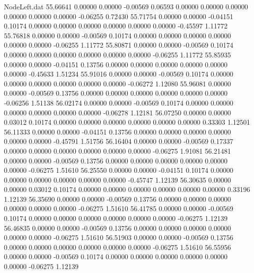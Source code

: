 \begin{filecontents}{NodeLeft.dat}
  55.66641    0.00000    0.00000    -0.00569    0.06593    0.00000    0.00000    0.00000    0.00000    0.00000    0.00000   -0.06255    0.72430
  55.71754    0.00000    0.00000    -0.04151    0.10174    0.00000    0.00000    0.00000    0.00000    0.00000    0.00000   -0.45597    1.11772
  55.76818    0.00000    0.00000    -0.00569    0.10174    0.00000    0.00000    0.00000    0.00000    0.00000    0.00000   -0.06255    1.11772
  55.80871    0.00000    0.00000    -0.00569    0.10174    0.00000    0.00000    0.00000    0.00000    0.00000    0.00000   -0.06255    1.11772
  55.85935    0.00000    0.00000    -0.04151    0.13756    0.00000    0.00000    0.00000    0.00000    0.00000    0.00000   -0.45633    1.51234
  55.91016    0.00000    0.00000    -0.00569    0.10174    0.00000    0.00000    0.00000    0.00000    0.00000    0.00000   -0.06272    1.12080
  55.96081    0.00000    0.00000    -0.00569    0.13756    0.00000    0.00000    0.00000    0.00000    0.00000    0.00000   -0.06256    1.51138
  56.02174    0.00000    0.00000    -0.00569    0.10174    0.00000    0.00000    0.00000    0.00000    0.00000    0.00000   -0.06278    1.12181
  56.07250    0.00000    0.00000     0.03012    0.10174    0.00000    0.00000    0.00000    0.00000    0.00000    0.00000    0.33303    1.12501
  56.11333    0.00000    0.00000    -0.04151    0.13756    0.00000    0.00000    0.00000    0.00000    0.00000    0.00000   -0.45791    1.51756
  56.16404    0.00000    0.00000    -0.00569    0.17337    0.00000    0.00000    0.00000    0.00000    0.00000    0.00000   -0.06275    1.91081
  56.21481    0.00000    0.00000    -0.00569    0.13756    0.00000    0.00000    0.00000    0.00000    0.00000    0.00000   -0.06275    1.51610
  56.25550    0.00000    0.00000    -0.04151    0.10174    0.00000    0.00000    0.00000    0.00000    0.00000    0.00000   -0.45747    1.12139
  56.30635    0.00000    0.00000     0.03012    0.10174    0.00000    0.00000    0.00000    0.00000    0.00000    0.00000    0.33196    1.12139
  56.35690    0.00000    0.00000    -0.00569    0.13756    0.00000    0.00000    0.00000    0.00000    0.00000    0.00000   -0.06275    1.51610
  56.41785    0.00000    0.00000    -0.00569    0.10174    0.00000    0.00000    0.00000    0.00000    0.00000    0.00000   -0.06275    1.12139
  56.46835    0.00000    0.00000    -0.00569    0.13756    0.00000    0.00000    0.00000    0.00000    0.00000    0.00000   -0.06275    1.51610
  56.51903    0.00000    0.00000    -0.00569    0.13756    0.00000    0.00000    0.00000    0.00000    0.00000    0.00000   -0.06275    1.51610
  56.55956    0.00000    0.00000    -0.00569    0.10174    0.00000    0.00000    0.00000    0.00000    0.00000    0.00000   -0.06275    1.12139

\end{filecontents}
